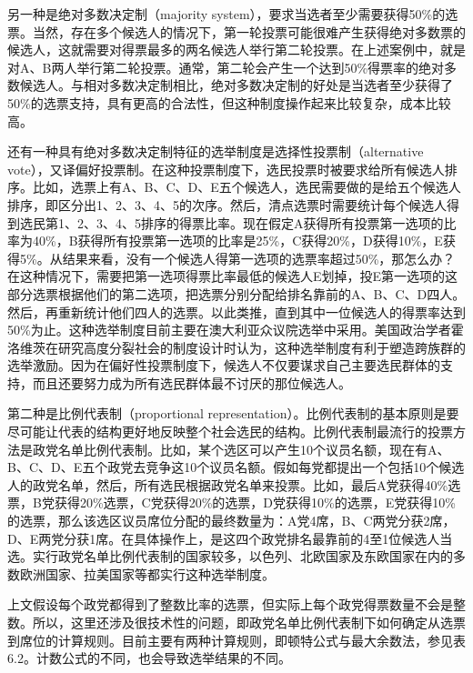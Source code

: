 另一种是绝对多数决定制（majority system），要求当选者至少需要获得50\%的选票。当然，存在多个候选人的情况下，第一轮投票可能很难产生获得绝对多数票的候选人，这就需要对得票最多的两名候选人举行第二轮投票。在上述案例中，就是对A、B两人举行第二轮投票。通常，第二轮会产生一个达到50\%得票率的绝对多数候选人。与相对多数决定制相比，绝对多数决定制的好处是当选者至少获得了50\%的选票支持，具有更高的合法性，但这种制度操作起来比较复杂，成本比较高。

还有一种具有绝对多数决定制特征的选举制度是选择性投票制（alternative vote），又译偏好投票制。在这种投票制度下，选民投票时被要求给所有候选人排序。比如，选票上有A、B、C、D、E五个候选人，选民需要做的是给五个候选人排序，即区分出1、2、3、4、5的次序。然后，清点选票时需要统计每个候选人得到选民第1、2、3、4、5排序的得票比率。现在假定A获得所有投票第一选项的比率为40\%，B获得所有投票第一选项的比率是25\%，C获得20\%，D获得10\%，E获得5\%。从结果来看，没有一个候选人得第一选项的选票率超过50\%，那怎么办？在这种情况下，需要把第一选项得票比率最低的候选人E划掉，投E第一选项的这部分选票根据他们的第二选项，把选票分别分配给排名靠前的A、B、C、D四人。然后，再重新统计他们四人的选票。以此类推，直到其中一位候选人的得票率达到50\%为止。这种选举制度目前主要在澳大利亚众议院选举中采用。美国政治学者霍洛维茨在研究高度分裂社会的制度设计时认为，这种选举制度有利于塑造跨族群的选举激励。因为在偏好性投票制度下，候选人不仅要谋求自己主要选民群体的支持，而且还要努力成为所有选民群体最不讨厌的那位候选人。

第二种是比例代表制（proportional representation）。比例代表制的基本原则是要尽可能让代表的结构更好地反映整个社会选民的结构。比例代表制最流行的投票方法是政党名单比例代表制。比如，某个选区可以产生10个议员名额，现在有A、B、C、D、E五个政党去竞争这10个议员名额。假如每党都提出一个包括10个候选人的政党名单，然后，所有选民根据政党名单来投票。比如，最后A党获得40\%选票，B党获得20\%选票，C党获得20\%的选票，D党获得10\%的选票，E党获得10\%的选票，那么该选区议员席位分配的最终数量为：A党4席，B、C两党分获2席，D、E两党分获1席。在具体操作上，是这四个政党排名最靠前的4至1位候选人当选。实行政党名单比例代表制的国家较多，以色列、北欧国家及东欧国家在内的多数欧洲国家、拉美国家等都实行这种选举制度。

上文假设每个政党都得到了整数比率的选票，但实际上每个政党得票数量不会是整数。所以，这里还涉及很技术性的问题，即政党名单比例代表制下如何确定从选票到席位的计算规则。目前主要有两种计算规则，即顿特公式与最大余数法，参见表6.2。计数公式的不同，也会导致选举结果的不同。

